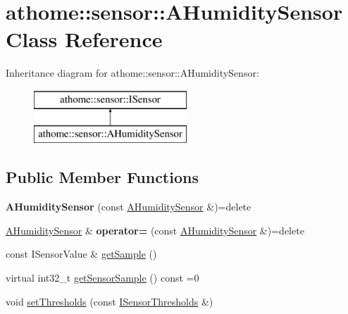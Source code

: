 \hypertarget{classathome_1_1sensor_1_1_a_humidity_sensor}{}\section{athome\+:\+:sensor\+:\+:A\+Humidity\+Sensor Class Reference}
\label{classathome_1_1sensor_1_1_a_humidity_sensor}
Inheritance diagram for athome\+:\+:sensor\+:\+:A\+Humidity\+Sensor\+:\begin{figure}[H]
\begin{center}
\leavevmode
\includegraphics[height=2.000000cm]{classathome_1_1sensor_1_1_a_humidity_sensor}
\end{center}
\end{figure}
\subsection*{Public Member Functions}
\begin{DoxyCompactItemize}
\item 
\mbox{\label{classathome_1_1sensor_1_1_a_humidity_sensor_aec2205040170bbf3c64fb1baf797795f}} 
{\bfseries A\+Humidity\+Sensor} (const \mbox{\hyperlink{classathome_1_1sensor_1_1_a_humidity_sensor}{A\+Humidity\+Sensor}} \&)=delete
\item 
\mbox{\label{classathome_1_1sensor_1_1_a_humidity_sensor_a530ebce44ecb090d32ab5450776f3c07}} 
\mbox{\hyperlink{classathome_1_1sensor_1_1_a_humidity_sensor}{A\+Humidity\+Sensor}} \& {\bfseries operator=} (const \mbox{\hyperlink{classathome_1_1sensor_1_1_a_humidity_sensor}{A\+Humidity\+Sensor}} \&)=delete
\item 
const I\+Sensor\+Value \& \mbox{\hyperlink{classathome_1_1sensor_1_1_a_humidity_sensor_a7af4527c70b539bec58cecfaae0aa80e}{get\+Sample}} ()
\item 
virtual int32\+\_\+t \mbox{\hyperlink{classathome_1_1sensor_1_1_a_humidity_sensor_a1eb32658be5cfc700523e74387e86053}{get\+Sensor\+Sample}} () const =0
\item 
void \mbox{\hyperlink{classathome_1_1sensor_1_1_a_humidity_sensor_a1a19bfee3db6b0940f1329b42d7ed0d0}{set\+Thresholds}} (const \mbox{\hyperlink{structathome_1_1sensor_1_1_i_sensor_1_1_i_sensor_thresholds}{I\+Sensor\+Thresholds}} \&)
\end{DoxyCompactItemize}
